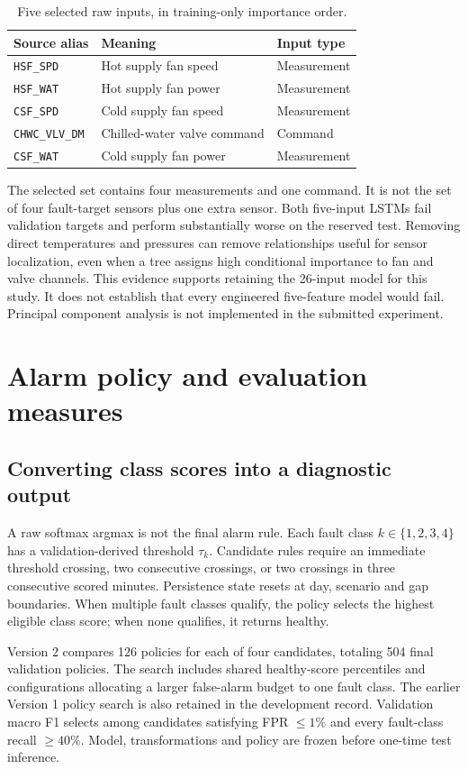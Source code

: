 \begin{table}[htbp]\centering\small
\caption{Five selected raw inputs, in training-only importance order.}\label{tab:five}
\begin{tabularx}{\linewidth}{l X l}
\toprule
Source alias & Meaning & Input type \\
\midrule
\texttt{HSF\_SPD} & Hot supply fan speed & Measurement \\
\texttt{HSF\_WAT} & Hot supply fan power & Measurement \\
\texttt{CSF\_SPD} & Cold supply fan speed & Measurement \\
\texttt{CHWC\_VLV\_DM} & Chilled-water valve command & Command \\
\texttt{CSF\_WAT} & Cold supply fan power & Measurement \\
\bottomrule\end{tabularx}
\end{table}

The selected set contains four measurements and one command. It is not the set of four fault-target sensors plus one extra sensor. Both five-input LSTMs fail validation targets and perform substantially worse on the reserved test. Removing direct temperatures and pressures can remove relationships useful for sensor localization, even when a tree assigns high conditional importance to fan and valve channels. This evidence supports retaining the 26-input model for this study. It does not establish that every engineered five-feature model would fail. Principal component analysis is not implemented in the submitted experiment.

\section{Alarm policy and evaluation measures}
\subsection{Converting class scores into a diagnostic output}
A raw softmax argmax is not the final alarm rule. Each fault class $k\in\{1,2,3,4\}$ has a validation-derived threshold $\tau_k$. Candidate rules require an immediate threshold crossing, two consecutive crossings, or two crossings in three consecutive scored minutes. Persistence state resets at day, scenario and gap boundaries. When multiple fault classes qualify, the policy selects the highest eligible class score; when none qualifies, it returns healthy.

Version 2 compares 126 policies for each of four candidates, totaling 504 final validation policies. The search includes shared healthy-score percentiles and configurations allocating a larger false-alarm budget to one fault class. The earlier Version 1 policy search is also retained in the development record. Validation macro F1 selects among candidates satisfying FPR $\leq1\%$ and every fault-class recall $\geq40\%$. Model, transformations and policy are frozen before one-time test inference.

